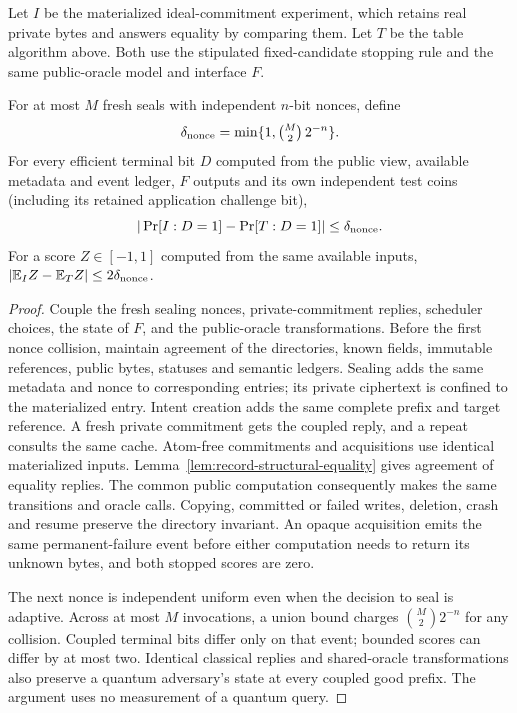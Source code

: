 Let $I$ be the materialized ideal-commitment experiment, which retains real
private bytes and answers equality by comparing them. Let $T$ be the table
algorithm above. Both use the stipulated fixed-candidate stopping rule and
the same public-oracle model and interface $F$.

\begin{theorem}
\label{thm:opaque-rendering}
For at most $M$ fresh seals with independent $n$-bit nonces, define
\[
 \delta_{\rm nonce}=\min\{1,\tbinom M2\,2^{-n}\}.
\]
For every efficient terminal bit $D$ computed from the public view, available
metadata and event ledger, $F$ outputs and its own independent test coins
(including its retained application challenge bit),
\[
  |\Pr[I:D=1]-\Pr[T:D=1]|\leq\delta_{\rm nonce}.
\]
For a score $Z\in[-1,1]$ computed from the same available inputs,
$|\mathbb E_I Z-\mathbb E_T Z|\leq2\delta_{\rm nonce}$.
\end{theorem}
\begin{proof}
Couple the fresh sealing nonces, private-commitment replies, scheduler choices,
the state of $F$, and the public-oracle transformations. Before the first
nonce collision, maintain agreement of the directories, known fields,
immutable references, public bytes, statuses and semantic ledgers.
Sealing adds the same metadata and nonce to corresponding entries; its
private ciphertext is confined to the materialized entry. Intent creation
adds the same complete prefix and target reference. A fresh private
commitment gets the coupled reply, and a repeat consults the same cache.
Atom-free commitments and acquisitions use identical materialized inputs.
Lemma~\ref{lem:record-structural-equality} gives agreement of equality replies.
The common public computation consequently makes the same transitions and
oracle calls. Copying, committed or failed writes, deletion, crash and
resume preserve the directory invariant. An opaque acquisition emits the
same permanent-failure event before either computation needs to return its
unknown bytes, and both stopped scores are zero.

The next nonce is independent uniform even when the decision to seal is
adaptive. Across at most $M$ invocations, a union bound charges
$\binom M2 2^{-n}$ for any collision. Coupled terminal bits differ only on
that event; bounded scores can differ by at most two. Identical classical
replies and shared-oracle transformations also preserve a quantum
adversary's state at every coupled good prefix. The argument uses no
measurement of a quantum query.
\end{proof}

